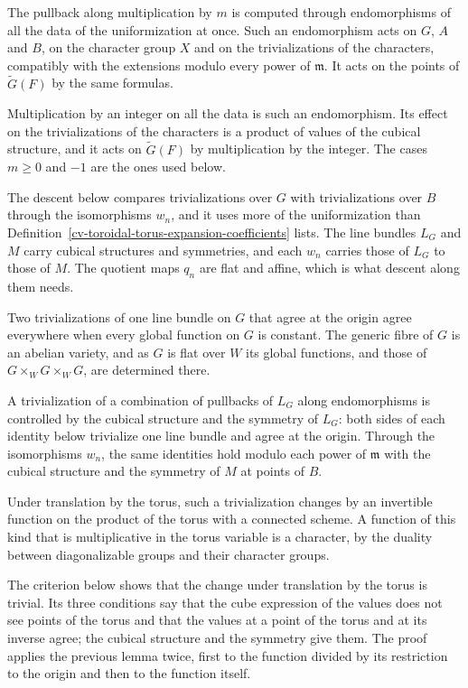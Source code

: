 The pullback along multiplication by $m$ is computed through endomorphisms of all the data of the uniformization
at once. Such an endomorphism acts on $G$, $A$ and $B$, on the character group $X$ and on the trivializations of
the characters, compatibly with the extensions modulo every power of $\mathfrak m$. It acts on the points of
$\tilde G(F)$ by the same formulas.

Multiplication by an integer on all the data is such an endomorphism. Its effect on the trivializations of the
characters is a product of values of the cubical structure, and it acts on $\tilde G(F)$ by multiplication by the
integer. The cases $m\ge0$ and $-1$ are the ones used below.

The descent below compares trivializations over $G$ with trivializations over $B$ through the isomorphisms $w_n$,
and it uses more of the uniformization than Definition~\ref{cv-toroidal-torus-expansion-coefficients} lists. The
line bundles $L_G$ and $M$ carry cubical structures and symmetries, and each $w_n$ carries those of $L_G$ to those
of $M$. The quotient maps $q_n$ are flat and affine, which is what descent along them needs.

Two trivializations of one line bundle on $G$ that agree at the origin agree everywhere when every global function
on $G$ is constant. The generic fibre of $G$ is an abelian variety, and as $G$ is flat over $W$ its global
functions, and those of $G\times_WG\times_WG$, are determined there.

A trivialization of a combination of pullbacks of $L_G$ along endomorphisms is controlled by the cubical structure
and the symmetry of $L_G$: both sides of each identity below trivialize one line bundle and agree at the origin.
Through the isomorphisms $w_n$, the same identities hold modulo each power of $\mathfrak m$ with the cubical
structure and the symmetry of $M$ at points of $B$.

Under translation by the torus, such a trivialization changes by an invertible function on the product of the
torus with a connected scheme. A function of this kind that is multiplicative in the torus variable is a character,
by the duality between diagonalizable groups and their character groups.

The criterion below shows that the change under translation by the torus is trivial. Its three conditions say that
the cube expression of the values does not see points of the torus and that the values at a point of the torus and
at its inverse agree; the cubical structure and the symmetry give them. The proof applies the previous lemma twice,
first to the function divided by its restriction to the origin and then to the function itself.

